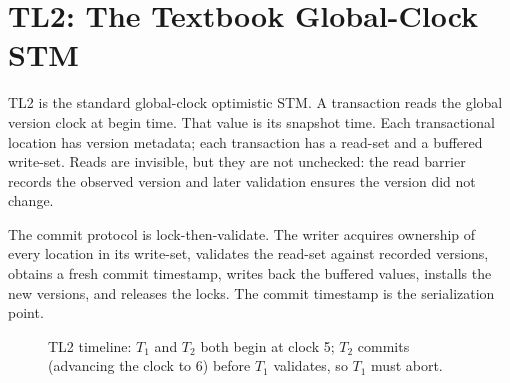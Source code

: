\section{TL2: The Textbook Global-Clock STM}

TL2 is the standard global-clock optimistic STM. A transaction reads the global version clock at begin time. That value is its snapshot time. Each transactional location has version metadata; each transaction has a read-set and a buffered write-set. Reads are invisible, but they are not unchecked: the read barrier records the observed version and later validation ensures the version did not change.

The commit protocol is lock-then-validate. The writer acquires ownership of every location in its write-set, validates the read-set against recorded versions, obtains a fresh commit timestamp, writes back the buffered values, installs the new versions, and releases the locks. The commit timestamp is the serialization point.

\begin{figure}[ht]
\centering
{}
\caption{TL2 timeline: $T_1$ and $T_2$ both begin at clock 5; $T_2$ commits (advancing the clock to 6) before $T_1$ validates, so $T_1$ must abort.}
\label{fig:tl2-timeline}
\end{figure}

